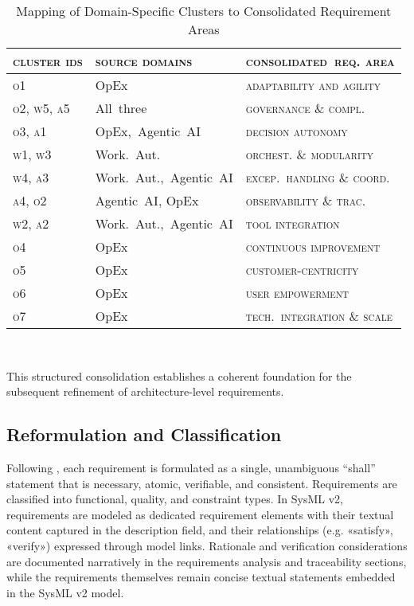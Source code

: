 \begin{table}[h!]
  \centering
  \begin{tabular}{p{3cm} p{4.5cm} p{5.5cm}}
    \toprule
    \textsc{cluster ids} & \textsc{source domains} & \textsc{consolidated~req. area} \\
    \midrule
    \textsc{o1} & OpEx & \textsc{adaptability and agility} \\
    \textsc{o2, w5, a5} & All~three & \textsc{governance \& compl.} \\
    \textsc{o3, a1} & OpEx,~Agentic~AI & \textsc{decision autonomy} \\
    \textsc{w1, w3} & Work.~Aut. & \textsc{orchest. \& modularity} \\
    \textsc{w4, a3} & Work.~Aut.,~Agentic~AI & \textsc{excep.~handling \& coord.} \\
    \textsc{a4, o2} & Agentic~AI, OpEx & \textsc{observability \& trac.} \\
    \textsc{w2, a2} & Work.~Aut.,~Agentic~AI & \textsc{tool integration} \\
    \textsc{o4} & OpEx & \textsc{continuous improvement} \\
    \textsc{o5} & OpEx & \textsc{customer-centricity} \\
    \textsc{o6} & OpEx & \textsc{user empowerment} \\
    \textsc{o7} & OpEx & \textsc{tech.~integration \& scale} \\
    \bottomrule
  \end{tabular}
  \caption{Mapping of Domain-Specific Clusters to Consolidated Requirement Areas}~\label{tab:req-clustering}
\end{table}

This structured consolidation establishes a coherent foundation for the subsequent refinement of architecture-level requirements.

\subsection{Reformulation and Classification}\label{subsec:req-clas}
Following \textcite{glinzHandbook2020}, each requirement is formulated as a single, unambiguous “shall” statement that is necessary, atomic, verifiable, and consistent. Requirements are classified into functional, quality, and constraint types. In SysML v2, requirements are modeled as dedicated requirement elements with their textual content captured in the description field, and their relationships (e.g. «satisfy», «verify») expressed through model links. Rationale and verification considerations are documented narratively in the requirements analysis and traceability sections, while the requirements themselves remain concise textual statements embedded in the SysML v2 model.

